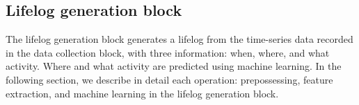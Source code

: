 \documentclass[conference]{IEEEtran}
\begin{document}
\begin{comment}
\subsubsection{Implementation of proposed system}
In this study, we implemented the proposed method on a name-tag-shaped device for office workers.
In this paper, we refer to this device as a name-tag sensor.
In the name-tag sensor, 2 solar cells with different characteristics in TABLE~\ref{tab:solar_cell} and piezoelectric element are used as energy harvesters.
By combining a dye-sensitized solar cell(sc1) and an amorphous solar cell(sc2), we can realize highly accurate context recognition while ensuring a stable power supply.
Fig.~\ref{fig:voltage_sensor_data} shows the transition of the solar cell voltage when wearing the name-tag sensor and visiting various places.
The average sampling rate in real-world operation tests was about 2.15Hz.
Using the power generated from these energy harvesters, the device acquires its own harvested energy(open-circuit voltage) and records to the non-volatile memory in the device.
At this time, the device uses only the power from the solar cell and not the power from the piezoelectric element as the power source.
The reason for this is that we did not consider the use of the piezoelectric element as power when designing the circuit.
The appearance of the name-tag sensor and the name-tag sensor circuit are shown in Fig.~\ref{fig:device_appearance} and Fig.~\ref{fig:sensor_board}.

\end{comment}


\subsection{Lifelog generation block}
The lifelog generation block generates a lifelog from the time-series data recorded in the data collection block, with three information: when, where, and what activity.
Where and what activity are predicted using machine learning.
In the following section, we describe in detail each operation: prepossessing, feature extraction, and machine learning in the lifelog generation block.
\end{document}
